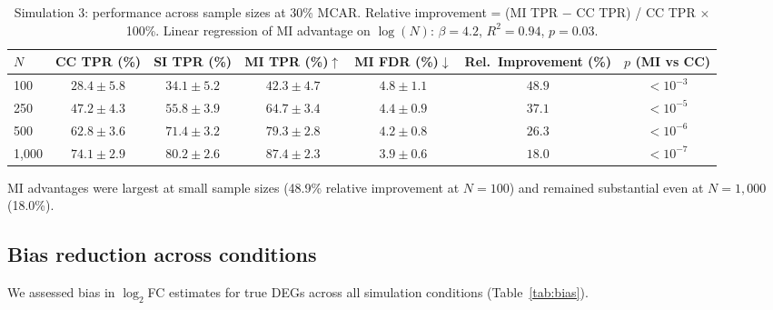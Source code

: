 \documentclass[11pt]{article}
\begin{document}
\begin{table}[H]
\centering
\caption{Simulation 3: performance across sample sizes at 30\% MCAR. Relative improvement = (MI TPR $-$ CC TPR) / CC TPR $\times$ 100\%. Linear regression of MI advantage on $\log(N)$: $\beta = 4.2$, $R^{2} = 0.94$, $p = 0.03$.}
\label{tab:sim3}
\begin{tabular}{lcccccc}
\toprule
\textbf{$N$} & \textbf{CC TPR (\%)} & \textbf{SI TPR (\%)} & \textbf{MI TPR (\%)}$\uparrow$ & \textbf{MI FDR (\%)}$\downarrow$ & \textbf{Rel.\ Improvement (\%)} & \textbf{$p$ (MI vs CC)} \\
\midrule
100 & $28.4 \pm 5.8$ & $34.1 \pm 5.2$ & $\mathbf{42.3 \pm 4.7}$ & $4.8 \pm 1.1$ & $48.9$ & $< 10^{-3}$ \\
250 & $47.2 \pm 4.3$ & $55.8 \pm 3.9$ & $\mathbf{64.7 \pm 3.4}$ & $4.4 \pm 0.9$ & $37.1$ & $< 10^{-5}$ \\
500 & $62.8 \pm 3.6$ & $71.4 \pm 3.2$ & $\mathbf{79.3 \pm 2.8}$ & $4.2 \pm 0.8$ & $26.3$ & $< 10^{-6}$ \\
1{,}000 & $74.1 \pm 2.9$ & $80.2 \pm 2.6$ & $\mathbf{87.4 \pm 2.3}$ & $3.9 \pm 0.6$ & $18.0$ & $< 10^{-7}$ \\
\bottomrule
\end{tabular}
\end{table}

MI advantages were largest at small sample sizes (48.9\% relative improvement at $N = 100$) and remained substantial even at $N = 1{,}000$ (18.0\%).

\subsection{Bias reduction across conditions}

We assessed bias in $\log_2$FC estimates for true DEGs across all simulation conditions (Table~\ref{tab:bias}).
\end{document}
